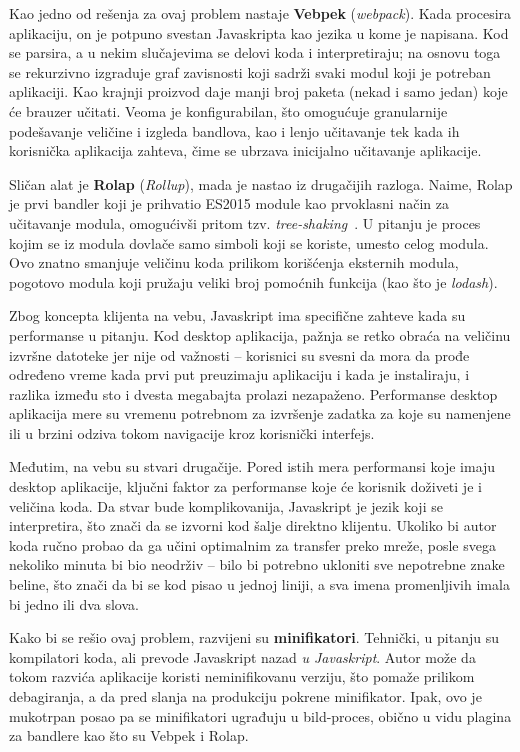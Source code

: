 Kao jedno od rešenja za ovaj problem nastaje \textbf{Vebpek} (\textsl{webpack}).
Kada procesira aplikaciju, on je potpuno svestan Javaskripta kao jezika u kome je napisana.
Kod se parsira, a u nekim slučajevima se delovi koda i interpretiraju; na osnovu toga se rekurzivno izgraduje graf zavisnosti koji sadrži svaki modul koji je potreban aplikaciji.
Kao krajnji proizvod daje manji broj paketa (nekad i samo jedan) koje će brauzer učitati.
Veoma je konfigurabilan, što omogućuje granularnije podešavanje veličine i
izgleda bandlova, kao i lenjo učitavanje tek kada ih korisnička aplikacija zahteva, čime se ubrzava inicijalno učitavanje aplikacije.

Sličan alat je \textbf{Rolap} (\textsl{Rollup}), mada je nastao iz drugačijih razloga.
Naime, Rolap je prvi bandler koji je prihvatio ES2015 module kao prvoklasni način za učitavanje modula, omogućivši pritom tzv. \textit{tree-shaking}~\cite{rollup-guide}.
U pitanju je proces kojim se iz modula dovlače samo simboli koji se koriste, umesto celog modula.
Ovo znatno smanjuje veličinu koda prilikom korišćenja eksternih modula, pogotovo modula koji pružaju veliki broj pomoćnih funkcija (kao što je \textit{lodash}).

Zbog koncepta klijenta na vebu, Javaskript ima specifične zahteve kada su performanse u pitanju.
Kod desktop aplikacija, pažnja se retko obraća na veličinu izvršne datoteke jer nije od važnosti -- korisnici su svesni da mora da prođe određeno vreme kada prvi put preuzimaju aplikaciju i kada je instaliraju, i razlika između sto i dvesta megabajta prolazi nezapaženo.
Performanse desktop aplikacija mere su vremenu potrebnom za izvršenje zadatka za koje su namenjene ili u brzini odziva tokom navigacije kroz korisnički interfejs.

Međutim, na vebu su stvari drugačije.
Pored istih mera performansi koje imaju desktop aplikacije, ključni faktor za performanse koje će korisnik doživeti je i veličina koda.
Da stvar bude komplikovanija, Javaskript je jezik koji se interpretira, što znači da se izvorni kod šalje direktno klijentu.
Ukoliko bi autor koda ručno probao da ga učini optimalnim za transfer preko mreže, posle svega nekoliko minuta bi bio neodrživ -- bilo bi potrebno ukloniti sve nepotrebne znake beline, što znači da bi se kod pisao u jednoj liniji, a sva imena promenljivih imala bi jedno ili dva slova.

Kako bi se rešio ovaj problem, razvijeni su \textbf{minifikatori}.
Tehnički, u pitanju su kompilatori koda, ali prevode Javaskript nazad \emph{u Javaskript}.
Autor može da tokom razvića aplikacije koristi neminifikovanu verziju, što pomaže prilikom debagiranja, a da pred slanja na produkciju pokrene minifikator.
Ipak, ovo je mukotrpan posao pa se minifikatori ugrađuju u bild-proces, obično u vidu plagina za bandlere kao što su Vebpek i Rolap.

